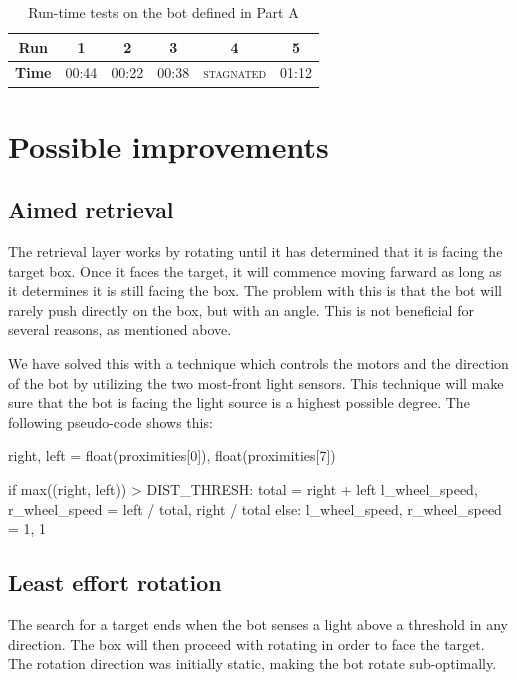 \documentclass[a4paper,10pt]{article}
\begin{document}
\begin{table}
    \centering
    \begin{tabular}{c|c|c|c|c|c}
        \textbf{Run}    & \textbf{1} & \textbf{2} & \textbf{3} &
        \textbf{4}      & \textbf{5}     \\ \hline
        \textbf{Time}   & 00:44 & 00:22 & 00:38 &
        \textsc{stagnated} & 01:12 \\
    \end{tabular}
    \caption{Run-time tests on the bot defined in Part A}
\end{table}


\section{Possible improvements}
\label{sec:b1}

\subsection{Aimed retrieval}

The retrieval layer works by rotating until it has determined that it is 
facing the target box. Once it faces the target, it will commence moving 
farward as long as it determines it is still facing the box. The problem with 
this is that the bot will rarely push directly on the box, but with an angle.  
This is not beneficial for several reasons, as mentioned above.

We have solved this with a technique which controls the motors and the 
direction of the bot by utilizing the two most-front light sensors. This 
technique will make sure that the bot is facing the light source is a highest 
possible degree. The following pseudo-code shows this:

\begin{python}
right, left = float(proximities[0]), float(proximities[7])

if max((right, left)) > DIST_THRESH:
    total = right + left
    l_wheel_speed, r_wheel_speed = left / total, right / total
else:
    l_wheel_speed, r_wheel_speed = 1, 1
\end{python}

\subsection{Least effort rotation}

The search for a target ends when the bot senses a light above a threshold in 
any direction. The box will then proceed with rotating in order to face the 
target. The rotation direction was initially static, making the bot rotate 
sub-optimally.
\end{document}
